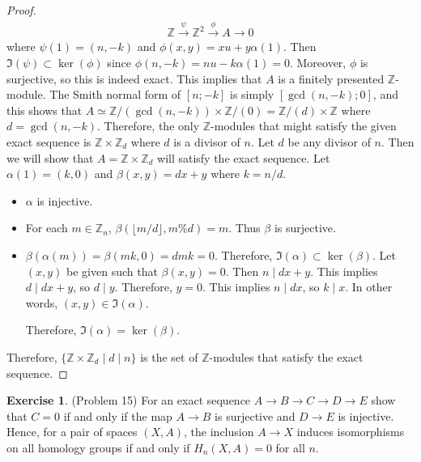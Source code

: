 \documentclass[12pt, psamsfonts]{amsart}
\theoremstyle{definition}
\newtheorem*{exer}{Exercise}
\theoremstyle{remark}
\numberwithin{equation}{section}
\begin{document}
\begin{proof}
  \begin{align*}
    \mathbb{Z} \xrightarrow{\psi} \mathbb{Z}^2 \xrightarrow{\phi} A \rightarrow 0
  \end{align*}
  where $\psi(1) = (n, -k)$ and $\phi(x, y) = xu + y\alpha(1)$.
  Then $\Im(\psi) \subset \ker(\phi)$ since $\phi(n, -k) = nu - k\alpha(1) = 0$.
  Moreover, $\phi$ is surjective, so this is indeed exact.
  This implies that $A$ is a finitely presented $\mathbb{Z}$-module.
  The Smith normal form of $[n; -k]$ is simply $[\gcd(n, -k); 0]$, and this shows that $A \simeq \mathbb{Z} / (\gcd(n, -k)) \times \mathbb{Z} / (0) = \mathbb{Z}/(d) \times \mathbb{Z}$ where $d = \gcd(n, -k)$.
  Therefore, the only $\mathbb{Z}$-modules that might satisfy the given exact sequence is $\mathbb{Z} \times \mathbb{Z}_d$ where $d$ is a divisor of $n$.
  Let $d$ be any divisor of $n$.
  Then we will show that $A = \mathbb{Z} \times \mathbb{Z}_d$ will satisfy the exact sequence.
  Let $\alpha(1) = (k, 0)$ and $\beta(x, y) = dx + y$ where $k = n / d$.
  \begin{itemize}
    \item
      $\alpha$ is injective.
    \item
      For each $m \in \mathbb{Z}_n$, $\beta(\lfloor m / d\rfloor, m \% d) = m$.
      Thus $\beta$ is surjective.
    \item
      $\beta(\alpha(m)) = \beta(mk, 0) = dmk = 0$.
      Therefore, $\Im(\alpha) \subset \ker(\beta)$.
      Let $(x, y)$ be given such that $\beta(x, y) = 0$.
      Then $n \mid dx + y$.
      This implies $d \mid dx + y$, so $d \mid y$.
      Therefore, $y = 0$.
      This implies $n \mid dx$, so $k \mid x$.
      In other words, $(x, y) \in \Im(\alpha)$.

      Therefore, $\Im(\alpha) = \ker(\beta)$.
  \end{itemize}
  Therefore, $\{ \mathbb{Z} \times \mathbb{Z}_d \mid d \mid n \}$ is the set of $\mathbb{Z}$-modules that satisfy the exact sequence.
\end{proof}

\begin{exer}{(Problem 15)}
  For an exact sequence $A \rightarrow B \rightarrow C \rightarrow D \rightarrow E$ show that $C = 0$ if and only if the map $A \rightarrow B$ is surjective and $D \rightarrow E$ is injective.
  Hence, for a pair of spaces $(X, A)$, the inclusion $A \rightarrow X$ induces isomorphisms on all homology groups if and only if $H_n(X, A) = 0$ for all $n$.
\end{exer}
\end{document}
